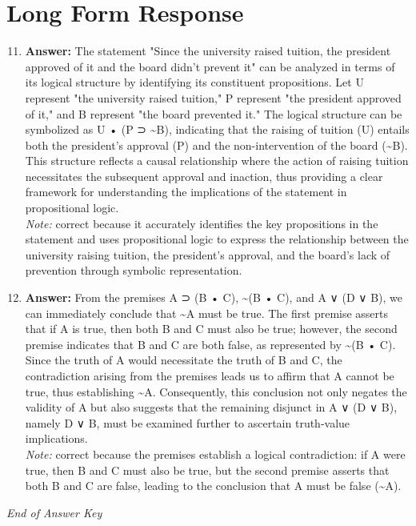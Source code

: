 \documentclass[12pt]{article}
\begin{document}
\section*{Long Form Response}
\begin{enumerate}[label=\arabic*.]
\setcounter{enumi}{10}
\item \textbf{Answer:} The statement "Since the university raised tuition, the president approved of it and the board didn't prevent it" can be analyzed in terms of its logical structure by identifying its constituent propositions. Let U represent "the university raised tuition," P represent "the president approved of it," and B represent "the board prevented it." The logical structure can be symbolized as U • (P ⊃ \textasciitilde{}B), indicating that the raising of tuition (U) entails both the president's approval (P) and the non-intervention of the board (\textasciitilde{}B). This structure reflects a causal relationship where the action of raising tuition necessitates the subsequent approval and inaction, thus providing a clear framework for understanding the implications of the statement in propositional logic.
\\ \textit{Note:} correct because it accurately identifies the key propositions in the statement and uses propositional logic to express the relationship between the university raising tuition, the president's approval, and the board's lack of prevention through symbolic representation.
\item \textbf{Answer:} From the premises A ⊃ (B • C), \textasciitilde{}(B • C), and A ∨ (D ∨ B), we can immediately conclude that \textasciitilde{}A must be true. The first premise asserts that if A is true, then both B and C must also be true; however, the second premise indicates that B and C are both false, as represented by \textasciitilde{}(B • C). Since the truth of A would necessitate the truth of B and C, the contradiction arising from the premises leads us to affirm that A cannot be true, thus establishing \textasciitilde{}A. Consequently, this conclusion not only negates the validity of A but also suggests that the remaining disjunct in A ∨ (D ∨ B), namely D ∨ B, must be examined further to ascertain truth-value implications.
\\ \textit{Note:} correct because the premises establish a logical contradiction: if A were true, then B and C must also be true, but the second premise asserts that both B and C are false, leading to the conclusion that A must be false (\textasciitilde{}A).
\end{enumerate}

\vfill
\noindent\textit{End of Answer Key}
\end{document}

